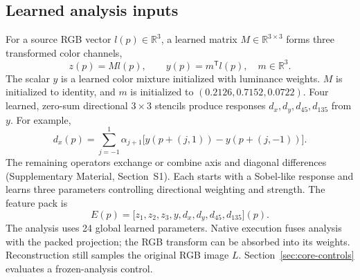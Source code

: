 \documentclass[10pt,twocolumn,letterpaper]{article}
\newcommand{\R}{\mathbb{R}}
\begin{document}
\subsection{Learned analysis inputs}
\label{sec:analysis}
For a source RGB vector $l(p)\in\R^3$, a learned matrix $M\in\R^{3\times3}$ forms three transformed color channels,
\begin{equation}
 z(p)=M l(p),\qquad y(p)=m^\mathsf{T}l(p),\quad m\in\R^3.
 \label{eq:analysis}
\end{equation}
The scalar $y$ is a learned color mixture initialized with luminance weights.
$M$ is initialized to identity, and $m$ is initialized to $(0.2126,0.7152,0.0722)$.
Four learned, zero-sum directional $3\times3$ stencils produce responses $d_x,d_y,d_{45},d_{135}$ from $y$.
For example,
\begin{equation}
 d_x(p)=\sum_{j=-1}^{1}\alpha_{j+1}
 \big[y(p+(j,1))-y(p+(j,-1))\big].
 \label{eq:dx}
\end{equation}
The remaining operators exchange or combine axis and diagonal differences (Supplementary Material, Section~S1).
Each starts with a Sobel-like response and learns three parameters controlling directional weighting and strength.
The feature pack is
\begin{equation}
 E(p)=\big[z_1,z_2,z_3,y,d_x,d_y,d_{45},d_{135}\big](p).
 \label{eq:pack}
\end{equation}
The analysis uses 24 global learned parameters.
Native execution fuses analysis with the packed projection; the RGB transform can be absorbed into its weights.
Reconstruction still samples the original RGB image $L$.
Section~\ref{sec:core-controls} evaluates a frozen-analysis control.
\end{document}
